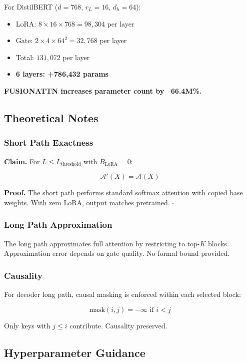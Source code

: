 For DistilBERT ($d=768$, $r_L=16$, $d_h=64$):

\begin{itemize}
\item LoRA: $8 \times 16 \times 768 = 98{,}304$ per layer
\item Gate: $2 \times 4 \times 64^2 = 32{,}768$ per layer
\item Total: $131{,}072$ per layer
\item \textbf{6 layers: +786,432 params}

\end{itemize}
\textbf{FUSIONATTN increases parameter count by ~66.4M\%.}

\subsection{Theoretical Notes}

\subsubsection{Short Path Exactness}

\textbf{Claim.} For $L \leq L_\text{threshold}$ with $B_\text{LoRA} = 0$:

\[
\mathcal{A}'(X) = \mathcal{A}(X)
\tag{4.9}
\]

\textbf{Proof.} The short path performs standard softmax attention with copied 
base weights. With zero LoRA, output matches pretrained. $\square$

\subsubsection{Long Path Approximation}

The long path approximates full attention by restricting to top-$K$ blocks. 
Approximation error depends on gate quality. No formal bound provided.

\subsubsection{Causality}

For decoder long path, causal masking is enforced within each selected block:

\[
\text{mask}(i, j) = -\infty \text{ if } i < j
\tag{4.10}
\]

Only keys with $j \leq i$ contribute. Causality preserved.

\subsection{Hyperparameter Guidance}

